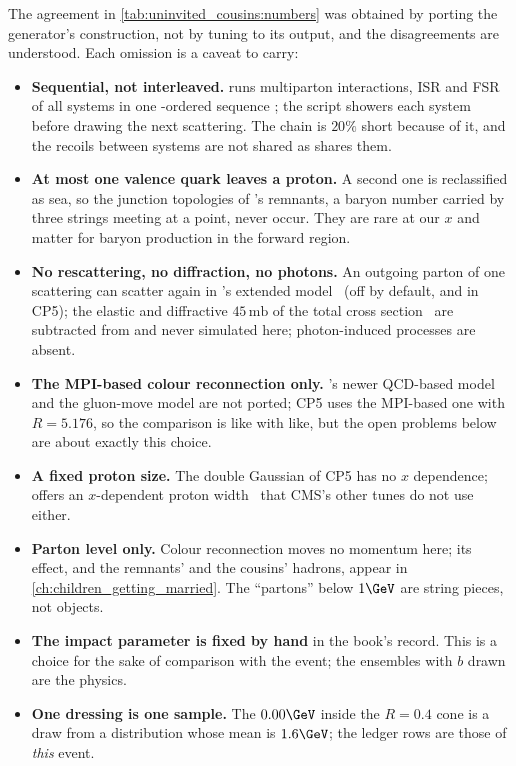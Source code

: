 The agreement in \cref{tab:uninvited_cousins:numbers} was obtained by
porting the generator's construction, not by tuning to its output, and the
disagreements are understood. Each omission is a caveat to carry:
\begin{itemize}
  \item \textbf{Sequential, not interleaved.} \PYTHIA runs multiparton
    interactions, ISR and FSR of all systems in one \pt-ordered sequence
    \cite{Sjostrand:2004ef}; the script showers each system before drawing
    the next scattering. The chain is $20\%$ short because of it, and the
    recoils between systems are not shared as \PYTHIA shares them.
  \item \textbf{At most one valence quark leaves a proton.} A second one is
    reclassified as sea, so the junction topologies of \PYTHIA's remnants,
    a baryon number carried by three strings meeting at a point, never
    occur. They are rare at our $x$ and matter for baryon production in
    the forward region.
  \item \textbf{No rescattering, no diffraction, no photons.} An outgoing
    parton of one scattering can scatter again in \PYTHIA's extended
    model~\cite{Corke:2009tk} (off by default, and in CP5); the elastic and
    diffractive $45\,\mathrm{mb}$ of the total cross
    section~\cite{Navin:2010kk} are subtracted from \signd and never
    simulated here; photon-induced
    processes are absent.
  \item \textbf{The MPI-based colour reconnection only.} \PYTHIA's newer
    QCD-based model~\cite{Christiansen:2015yqa} and the gluon-move model
    are not ported; CP5 uses the MPI-based one with $R=5.176$, so the
    comparison is like with like, but the open problems below are about
    exactly this choice.
  \item \textbf{A fixed proton size.} The double Gaussian of CP5 has no
    $x$ dependence; \PYTHIA offers an $x$-dependent proton
    width~\cite{Corke:2011yy} that CMS's other tunes do not use either.
  \item \textbf{Parton level only.} Colour reconnection moves no momentum
    here; its effect, and the remnants' and the cousins' hadrons, appear in
    \cref{ch:children_getting_married}. The ``partons'' below $1\GeV$ are string
    pieces, not objects.
  \item \textbf{The impact parameter is fixed by hand} in the book's record.
    This is a choice for the sake of comparison with the \CMSSW event; the
    ensembles with $b$ drawn are the physics.
  \item \textbf{One dressing is one sample.} The $0.00\GeV$ inside the
    $R=0.4$ cone is a draw from a distribution whose mean is $1.6\GeV$; the
    ledger rows are those of \emph{this} event.
\end{itemize}

